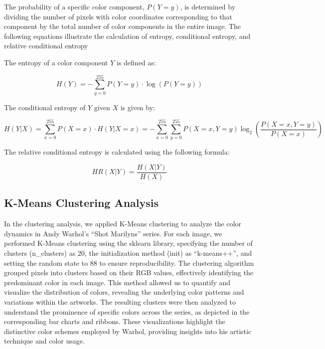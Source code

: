 \documentclass{article}
\begin{document}
The probability of a specific color component, \(P(Y=y)\), is determined
by dividing the number of pixels with color coordinates corresponding to
that component by the total number of color components in the entire
image. The following equations illustrate the calculation of entropy,
conditional entropy, and relative conditional entropy

The entropy of a color component \(Y\) is defined as:

\begin{equation}
    H(Y) = - \sum_{y=0}^{255} P(Y = y) \cdot \log(P(Y = y))
\end{equation}

The conditional entropy of \(Y\) given \(X\) is given by:

\begin{equation}
    H(Y|X) = \sum_{x=0}^{255} P(X = x) \cdot H(Y|X = x) = - \sum_{x=0}^{255} \sum_{y=0}^{255} P(X = x, Y = y) \log_2 \left(\frac{P(X = x, Y = y)}{P(X = x)}\right)
\end{equation}

The relative conditional entropy is calculated using the following
formula:

\begin{equation}
    HR(X|Y) = \frac{H(X|Y)}{H(X)}
\end{equation}

\hypertarget{k-means-clustering-analysis}{%
\subsection{K-Means Clustering
Analysis}\label{k-means-clustering-analysis}}

In the clustering analysis, we applied K-Means clustering to analyze the
color dynamics in Andy Warhol's ``Shot Marilyns'' series. For each
image, we performed K-Means clustering using the sklearn library,
specifying the number of clusters (n\_clusters) as 20, the
initialization method (init) as ``k-means++'', and setting the random
state to 88 to ensure reproducibility. The clustering algorithm grouped
pixels into clusters based on their RGB values, effectively identifying
the predominant color in each image. This method allowed us to quantify
and visualize the distribution of colors, revealing the underlying color
patterns and variations within the artworks. The resulting clusters were
then analyzed to understand the prominence of specific colors across the
series, as depicted in the corresponding bar charts and ribbons. These
visualizations highlight the distinctive color schemes employed by
Warhol, providing insights into his artistic technique and color usage.
\end{document}
